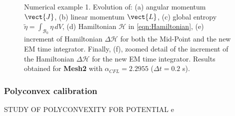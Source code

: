 \begin{figure}[hbtp]
\begin{tabular}{ccc}
	\end{tabular}
	\caption{Numerical example 1. Evolution of: (a) angular momentum $\vect{J}$, (b) linear momentum $\vect{L}$, (c) global entropy $\tilde{\eta}=\int_{\mathcal{B}_0}\eta\,dV$, (d) Hamiltonian $\mathcal{H}$  in \eqref{eqn:Hamiltonian}, (e) increment of Hamiltonian $\Delta\mathcal{H}$ for both the Mid-Point and the new EM time integrator.  Finally, (f), zoomed detail of the increment of the Hamiltonian  $\Delta\mathcal{H}$ for the new EM time integrator. Results obtained for \textbf{Mesh2} with $\alpha_{CFL}=2.2955$ ($\Delta t=0.2$ s).}
	\label{fig:example 1 energy balance}
\end{figure}

\clearpage


\subsubsection{Polyconvex calibration}\label{sec:polyconvexity}

STUDY OF POLYCONVEXITY FOR POTENTIAL e

